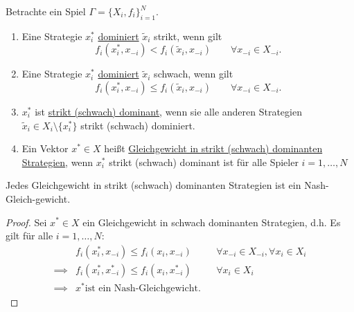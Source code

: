 \begin{definition}
	Betrachte ein Spiel $\Gamma = \{X_{i}, f_{i}\}_{i=1}^{N}$.
	\begin{enumerate}[label=\alph{enumi})]
		\item Eine Strategie $x_{i}^{*}$ \underline{dominiert} $\tilde{x}_{i}$ strikt, wenn gilt
			\[
				f_{i}(x_{i}^{*}, x_{-i}) < f_{i}(\tilde{x}_{i}, x_{-i}) \qquad \forall x_{-i} \in X_{-i}
			.\] 
		\item Eine Strategie $x_{i}^{*}$ \underline{dominiert} $\tilde{x}_{i}$ schwach, wenn gilt
			\[
				f_{i}(x_{i}^{*}, x_{-i}) \leq f_{i}(\tilde{x}_{i}, x_{-i}) \qquad \forall x_{-i} \in X_{-i}
			.\] 
		\item $x_{i}^{*}$ ist \underline{strikt (schwach) dominant}, wenn sie alle anderen Strategien $\tilde{x}_{i} \in X_{i} \setminus \{x_{i}^{*}\}$ strikt (schwach) dominiert.
		\item Ein Vektor $x^{*} \in X$ heißt \underline{Gleichgewicht in strikt (schwach) dominanten Strategien}, wenn $x_{i}^{*}$ strikt (schwach) dominant ist für alle Spieler $i=1, \ldots, N$ 
	\end{enumerate}
\end{definition}

\begin{satz}
	Jedes Gleichgewicht in strikt (schwach) dominanten
	Strategien ist ein Nash-Gleich-gewicht.
\end{satz}

\begin{proof}
	Sei $x^{*} \in X$ ein Gleichgewicht in schwach dominanten Strategien, d.h. Es gilt für alle $i=1, \ldots, N$:
	\begin{align*}
		&f_{i}(x_{i}^{*}, x_{-i}) \leq f_{i}(x_{i}, x_{-i})& &\forall x_{-i} \in X_{-i}, \forall x_{i} \in X_{i} \\
		\implies &f_{i}(x_{i}^{*}, x_{-i}^{*}) \leq f_{i}(x_{i}, x_{-i}^{*})& &\forall x_{i} \in X_{i} \\
		\implies &x^{*} \text{ist ein Nash-Gleichgewicht.}
	\end{align*}
\end{proof}


